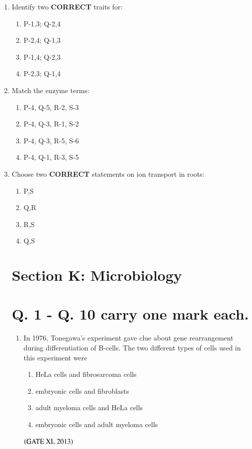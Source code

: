 \documentclass[journal]{IEEEtran}
\begin{document}
\begin{enumerate}
\item Identify two \textbf{CORRECT} traits for:\hfill  \textit{}
\begin{enumerate}
    \item P-1,3; Q-2,4
    \item P-2,4; Q-1,3
    \item P-1,4; Q-2,3
    \item P-2,3; Q-1,4
\end{enumerate}

\item Match the enzyme terms:\hfill  \textit{}
\begin{enumerate}
    \item P-4, Q-5, R-2, S-3
    \item P-4, Q-3, R-1, S-2
    \item P-4, Q-3, R-5, S-6
    \item P-4, Q-1, R-3, S-5
\end{enumerate}

\item Choose two \textbf{CORRECT} statements on ion transport in roots:\hfill  \textit{}
\begin{enumerate}
    \item P,S
    \item Q,R
    \item R,S
    \item Q,S
\end{enumerate}

\clearpage
\section*{Section K: Microbiology}

\section*{Q. 1 - Q. 10 carry one mark each.}

\begin{enumerate}
\item In 1976, Tonegawa's experiment gave clue about gene rearrangement during differentiation of B-cells. The two different types of cells used in this experiment were
\begin{enumerate}
\item HeLa cells and fibrosarcoma cells
\item embryonic cells and fibroblasts
\item adult myeloma cells and HeLa cells
\item embryonic cells and adult myeloma cells
\end{enumerate}
\hfill $\left(\text{GATE XL 2013}\right)$


\end{enumerate}
\end{enumerate}
\end{document}
